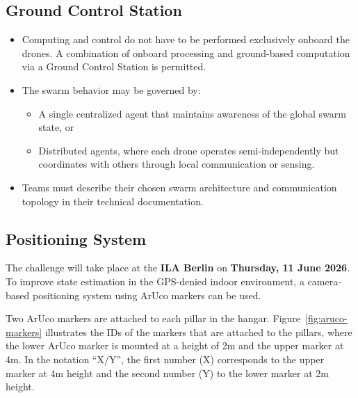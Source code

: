 \subsection{Ground Control Station}
\begin{itemize}
	\item{Computing and control do not have to be performed exclusively onboard the drones. A combination of onboard processing and ground-based computation via a Ground Control Station is permitted.}
	\item{The swarm behavior may be governed by:}
	\begin{itemize}[label=--]
		\item{A single centralized agent that maintains awareness of the global swarm state, or}
		\item{Distributed agents, where each drone operates semi-independently but coordinates with others through local communication or sensing.}
	\end{itemize}
	\item{Teams must describe their chosen swarm architecture and communication topology in their technical documentation.}
\end{itemize}

\subsection{Positioning System}
The challenge will take place at the \textbf{ILA Berlin} on \textbf{Thursday, 11 June 2026}. To improve state estimation in the GPS-denied indoor environment, a camera-based positioning system using ArUco markers can be used.

Two ArUco markers are attached to each pillar in the hangar. Figure~\ref{fig:aruco-markers} illustrates the IDs of the markers that are attached to the pillars, where the lower ArUco marker is mounted at a height of 2m and the upper marker at 4m. In the notation ``X/Y'', the first number (X) corresponds to the upper marker at 4m height and the second number (Y) to the lower marker at 2m height.

